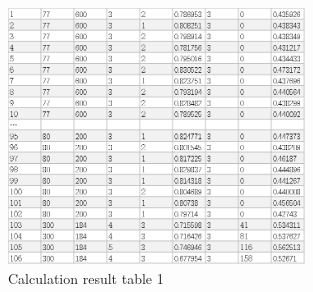 \begin{enumerate}
\begin{figure}[H]
\centering
\includegraphics[width=0.7\textwidth]{figures/data3_3.png}
\caption{Calculation result table 1}
\label{fig:label}
\end{figure}


\end{enumerate}
